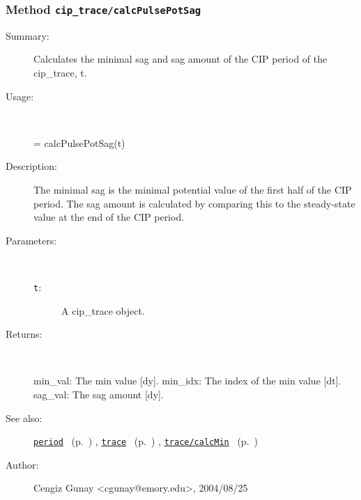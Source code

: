 \subsubsection[Method \texttt{calcPulsePotSag}]{Method \texttt{cip\_trace/calcPulsePotSag}}%
%
\label{ref_cip_trace__calcPulsePotSag}%
\hypertarget{ref_cip_trace__calcPulsePotSag}{}%
\begin{description}
\item[Summary:]Calculates the minimal sag and sag amount of the CIP period of the cip\_trace, t. 
%
\item[Usage:]~%
\begin{lyxcode}%
[min\_val, min\_idx, sag\_val] = calcPulsePotSag(t)
%
\end{lyxcode}%
%
\item[Description:]%
The minimal sag is the minimal potential value of the 
 first half of the CIP period. The sag amount is calculated by 
 comparing this to the steady-state value at the end of the CIP period.
\item[Parameters:]~
\begin{description}%
\item[\texttt{t}:]
 A cip\_trace object.
\end{description}%
%
\item[Returns:]~

	min\_val: The min value [dy].
	min\_idx: The index of the min value [dt].
	sag\_val: The sag amount [dy].
%
%
\item[See also:]%
\hyperlink{ref_period}{\texttt{period}}%
\ (p.~\pageref{ref_period})%
%
, \hyperlink{ref_trace}{\texttt{trace}}%
\ (p.~\pageref{ref_trace})%
%
, \hyperlink{ref_trace__calcMin}{\texttt{trace/calcMin}}%
\ (p.~\pageref{ref_trace__calcMin})%
%
%
\item[Author:]%
Cengiz Gunay <cgunay@emory.edu>, 2004/08/25%
\end{description}
\methodline%
